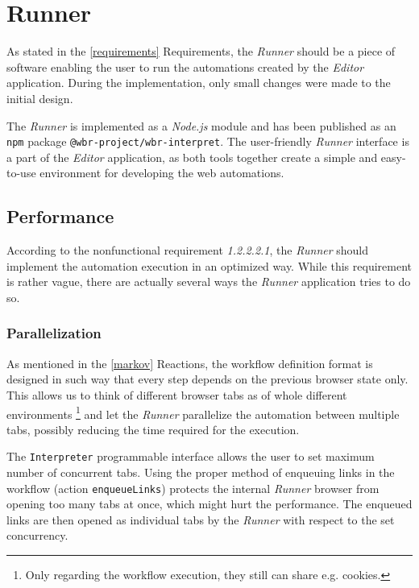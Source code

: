 \section{Runner}
As stated in the \autoref{requirements} Requirements, the \textit{Runner} should be a piece of software enabling the user to run the automations created by the \textit{Editor} application.
During the implementation, only small changes were made to the initial design.

The \textit{Runner} is implemented as a \textit{Node.js} module and has been published as an \texttt{npm} package \texttt{@wbr-project/wbr-interpret}.
The user-friendly \textit{Runner} interface is a part of the \textit{Editor} application, as both tools together create a simple and easy-to-use environment for developing the web automations.

\subsection{Performance}

According to the nonfunctional requirement \textit{1.2.2.2.1}, the \textit{Runner} should implement the automation execution in an optimized way. 
While this requirement is rather vague, there are actually several ways the \textit{Runner} application tries to do so.

\subsubsection{Parallelization}

As mentioned in the \autoref{markov} Reactions, the workflow definition format is designed in such way that every step depends on the previous browser state only. 
This allows us to think of different browser tabs as of whole different environments \footnote{Only regarding the workflow execution, they still can share e.g. cookies.} 
and let the \textit{Runner} parallelize the automation between multiple tabs, possibly reducing the time required for the execution.

The \texttt{Interpreter} programmable interface allows the user to set maximum number of concurrent tabs.
Using the proper method of enqueuing links in the workflow (action \texttt{enqueueLinks}) protects the internal \textit{Runner} browser from opening too many tabs at once, which might hurt the performance.
The enqueued links are then opened as individual tabs by the \textit{Runner} with respect to the set concurrency.

